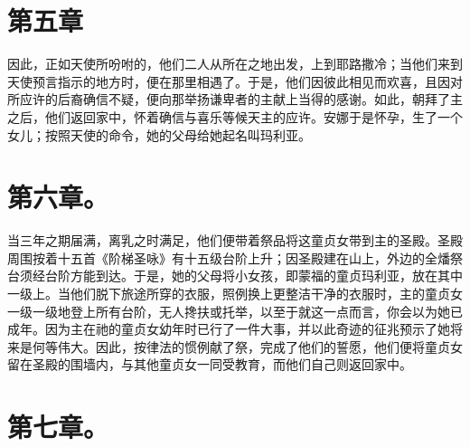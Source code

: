 
\section{第五章}

因此，正如天使所吩咐的，他们二人从所在之地出发，上到耶路撒冷；当他们来到天使预言指示的地方时，便在那里相遇了。于是，他们因彼此相见而欢喜，且因对所应许的后裔确信不疑，便向那举扬谦卑者的主献上当得的感谢。如此，朝拜了主之后，他们返回家中，怀着确信与喜乐等候天主的应许。安娜于是怀孕，生了一个女儿；按照天使的命令，她的父母给她起名叫玛利亚。\par


\section{第六章。}

当三年之期届满，离乳之时满足，他们便带着祭品将这童贞女带到主的圣殿。圣殿周围按着十五首《阶梯圣咏》有十五级台阶上升；因圣殿建在山上，外边的全燔祭台须经台阶方能到达。于是，她的父母将小女孩，即蒙福的童贞玛利亚，放在其中一级上。当他们脱下旅途所穿的衣服，照例换上更整洁干净的衣服时，主的童贞女一级一级地登上所有台阶，无人搀扶或托举，以至于就这一点而言，你会以为她已成年。因为主在祂的童贞女幼年时已行了一件大事，并以此奇迹的征兆预示了她将来是何等伟大。因此，按律法的惯例献了祭，完成了他们的誓愿，他们便将童贞女留在圣殿的围墙内，与其他童贞女一同受教育，而他们自己则返回家中。\par


\section{第七章。}

